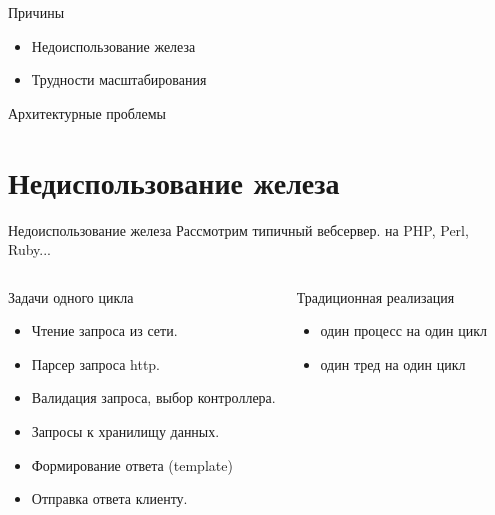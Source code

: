 \documentclass[aspectratio=169]{beamer}
\begin{document}
\begin{frame}{Причины}
    \begin{itemize}
        \pause
        \item Недоиспользование железа

        \pause
        \item Трудности масштабирования
    \end{itemize}

    \pause
    \begin{block}
        {\huge Архитектурные проблемы}
    \end{block}
\end{frame}

\section{Недиспользование железа}
\begin{frame}{Недоиспользование железа}
    Рассмотрим типичный вебсервер.
    \pause на PHP\pause, Perl\pause, Ruby\pause...

    \begin{columns}
        \begin{block}{Задачи одного цикла}
            \begin{itemize}
                \pause
                \item Чтение запроса из сети.

                \pause
                \item Парсер запроса http.

                \pause
                \item Валидация запроса, выбор контроллера.

                \pause
                \item Запросы к хранилищу данных.

                \pause
                \item Формирование ответа (template)

                \pause
                \item Отправка ответа клиенту.
            \end{itemize}
        \end{block}

        \pause
        \begin{block}{Традиционная реализация}
            \begin{itemize}
                \pause
                \item один процесс на один цикл
                
                \pause
                \item один тред на один цикл
            \end{itemize}

        \end{block}
    \end{columns}
\end{frame}
\end{document}
